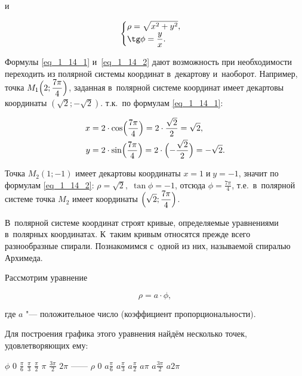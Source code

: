 и

\begin{equation}\label{eq_1_14_2}
\begin{cases}
\rho = \sqrt{x^{2} + y^{2}}, \\
\displaystyle \tg \phi = \frac{y}{x}.
\end{cases}
\end{equation}

Формулы \eqref{eq_1_14_1} и~\eqref{eq_1_14_2} дают возможность при необходимости
переходить из полярной системы координат в~декартову и~наоборот.
Например, точка $\displaystyle M_{1} \Bigl(2; \frac{7\pi}{4} \Bigr)$,
заданная в~полярной системе координат имеет
декартовы координаты $(\sqrt{2}; -\sqrt{2})$.
т.к.\ по формулам \eqref{eq_1_14_1}:

\begin{align*}
\displaystyle x &= 2 \cdot \cos \Bigl( \frac{7\pi}{4} \Bigr) =
2 \cdot \frac{\sqrt{2}}{2} = \sqrt{2}, \\
\displaystyle y &= 2 \cdot \sin \Bigl( \frac{7\pi}{4} \Bigr) =
2 \cdot \Bigl( -\frac{\sqrt{2}}{2} \Bigr) = -\sqrt{2}. \\
\end{align*}

Точка $M_{2}(1; -1)$ имеет декартовы координаты
$x = 1 \; \text{и} \; y = -1$,
значит по формулам \eqref{eq_1_14_2}:
$\rho = \sqrt{2}, \; \tan \phi = -1$,
отсюда
$\displaystyle \phi = \frac{7\pi}{4}$,
т.е.\ в~полярной системе точка $M_{2}$ имеет координаты 
$\displaystyle \Bigl( \sqrt{2}; \frac{7\pi}{4} \Bigr)$.

В~полярной системе координат строят кривые, определяемые уравнениями в~полярных
координатах. К~таким кривым относятся прежде всего разнообразные спирали.
Познакомимся с~одной из них, называемой спиралью Архимеда.

Рассмотрим уравнение

\begin{equation*}\label{eq_1_14_3}
\rho = a \cdot \phi,
\end{equation*}

где $a$ "--- положительное число (коэффициент пропорциональности).

Для построения графика этого уравнения найдём несколько точек,
удовлетворяющих ему:

$\phi$
0
$\displaystyle \frac{\pi}{6}$
$\displaystyle \frac{\pi}{3}$
$\displaystyle \frac{\pi}{2}$
$\pi$
$\displaystyle \frac{3\pi}{2}$
$2\pi$
------
$\rho$
0
$\displaystyle a\frac{\pi}{6}$
$\displaystyle a\frac{\pi}{3}$
$\displaystyle a\frac{\pi}{2}$
$a\pi$
$\displaystyle a\frac{3\pi}{2}$
$a2\pi$

